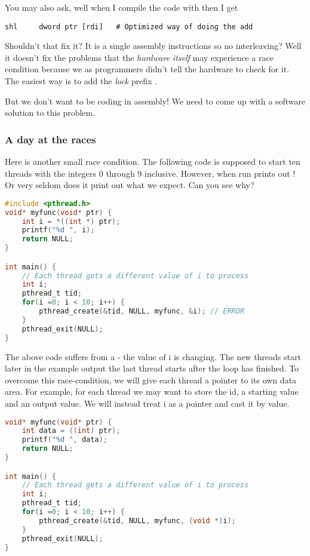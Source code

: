You may also ask, well when I compile the code with  then I get

\begin{verbatim}
shl     dword ptr [rdi]   # Optimized way of doing the add
\end{verbatim}

Shouldn't that fix it? It is a single assembly instructions so no interleaving?
Well it doesn't fix the problems that the \textit{hardware itself} may experience a race condition because we as programmers didn't tell the hardware to check for it.
The easiest way is to add the \textit{lock} prefix \cite[p. 1120]{guide2011intel}.

But we don't want to be coding in assembly!
We need to come up with a software solution to this problem.

\subsubsection{A day at the races}

Here is another small race condition.
The following code is supposed to start ten threads with the integers 0 through 9 inclusive.
However, when run prints out !
Or very seldom does it print out what we expect.
Can you see why?

\begin{lstlisting}[language=C]
#include <pthread.h>
void* myfunc(void* ptr) {
    int i = *((int *) ptr);
    printf("%d ", i);
    return NULL;
}

int main() {
    // Each thread gets a different value of i to process
    int i;
    pthread_t tid;
    for(i =0; i < 10; i++) {
        pthread_create(&tid, NULL, myfunc, &i); // ERROR
    }
    pthread_exit(NULL);
}
\end{lstlisting}

The above code suffers from a  - the value of i is changing.
The new threads start later in the example output the last thread starts after the loop has finished.
To overcome this race-condition, we will give each thread a pointer to its own data area.
For example, for each thread we may want to store the id, a starting value and an output value.
We will instead treat i as a pointer and cast it by value.

\begin{lstlisting}[language=C]
void* myfunc(void* ptr) {
    int data = ((int) ptr);
    printf("%d ", data);
    return NULL;
}

int main() {
    // Each thread gets a different value of i to process
    int i;
    pthread_t tid;
    for(i =0; i < 10; i++) {
        pthread_create(&tid, NULL, myfunc, (void *)i);
    }
    pthread_exit(NULL);
}
\end{lstlisting}

